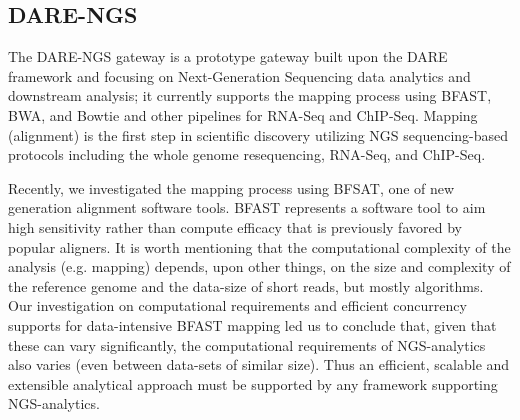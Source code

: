 \documentclass[]{svjour3}
\begin{document}

\subsection{DARE-NGS}
The DARE-NGS gateway %
is a prototype gateway built upon the DARE framework and focusing on Next-Generation Sequencing data analytics and downstream analysis; it currently supports the mapping
process using BFAST, BWA, and Bowtie and other pipelines for RNA-Seq and ChIP-Seq\cite{mardis2008-arghg,pepke2009}. Mapping (alignment) is the first
step in scientific discovery utilizing NGS sequencing-based protocols
including the whole genome resequencing, RNA-Seq, and ChIP-Seq. 

Recently, we investigated the mapping process using BFSAT, one of new generation alignment software tools. BFAST represents a software tool to aim high sensitivity rather than compute efficacy that is previously favored by popular aligners. It is worth mentioning that the computational complexity of the
analysis (e.g. mapping) depends, upon other things, on the size and
complexity of the reference genome and the data-size of short reads, but mostly algorithms\cite{ecmls11}.
Our investigation on computational requirements and efficient concurrency supports for data-intensive BFAST mapping led us to conclude that, given that these can vary significantly, the computational
requirements of NGS-analytics also varies (even between data-sets of
similar size). Thus an efficient, scalable and extensible analytical
approach must be supported by any framework supporting NGS-analytics.

\end{document}
